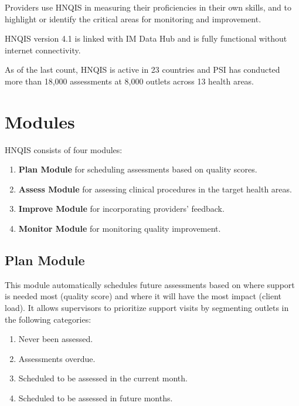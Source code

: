 \documentclass[]{book}
\providecommand{\tightlist}{%
  \setlength{\itemsep}{0pt}\setlength{\parskip}{0pt}}
\begin{document}
Providers use HNQIS in measuring their proficiencies in their own skills, and to highlight or identify the critical areas for monitoring and improvement.

HNQIS version 4.1 is linked with IM Data Hub and is fully functional without internet connectivity.

As of the last count, HNQIS is active in 23 countries and PSI has conducted more than 18,000 assessments at 8,000 outlets across 13 health areas.

\hypertarget{modules}{%
\section{Modules}\label{modules}}

HNQIS consists of four modules:

\begin{enumerate}
\def\labelenumi{\arabic{enumi}.}
\tightlist
\item
  \textbf{Plan Module} for scheduling assessments based on quality scores.
\item
  \textbf{Assess Module} for assessing clinical procedures in the target health areas.\\
\item
  \textbf{Improve Module} for incorporating providers' feedback.
\item
  \textbf{Monitor Module} for monitoring quality improvement.
\end{enumerate}

\hypertarget{plan-module}{%
\subsection{Plan Module}\label{plan-module}}

This module automatically schedules future assessments based on where support is needed most (quality score) and where it will have the most impact (client load). It allows supervisors to prioritize support visits by segmenting outlets in the following categories:

\begin{enumerate}
\def\labelenumi{\arabic{enumi}.}
\tightlist
\item
  Never been assessed.
\item
  Assessments overdue.
\item
  Scheduled to be assessed in the current month.
\item
  Scheduled to be assessed in future months.
\end{enumerate}
\end{document}
